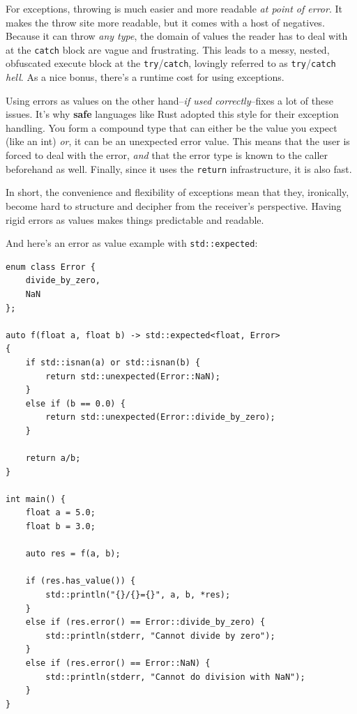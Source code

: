 \documentclass[12pt, letterpaper]{article}
\newenvironment{answerblock}{\color{Green4}}{\normalcolor\vspace{1em}}
\begin{document}
\begin{answerblock}
For exceptions, throwing is much easier and more readable
\emph{at point of error}. It makes the throw site more readable, but it comes
with a host of negatives. Because it can throw \emph{any type}, the domain of
values the reader has to deal with at the \texttt{catch} block are vague and
frustrating. This leads to a messy, nested, obfuscated execute block at the
\texttt{try}/\texttt{catch}, lovingly referred to as
\texttt{try}/\texttt{catch} \emph{hell}. As a nice bonus, there's a runtime
cost for using exceptions.

Using errors as values on the other hand--\emph{if used correctly}--fixes a lot
of these issues. It's why \textbf{safe} languages like Rust adopted this style
for their exception handling. You form a compound type that can either be the
value you expect (like an int) \emph{or}, it can be an unexpected error value.
This means that the user is forced to deal with the error, \emph{and} that the
error type is known to the caller beforehand as well. Finally, since it uses
the \texttt{return} infrastructure, it is also fast.

In short, the convenience and flexibility of exceptions mean that they,
ironically, become hard to structure and decipher from the receiver's
perspective. Having rigid errors as values makes things predictable and
readable.

And here's an error as value example with \texttt{std::expected}:

\begin{minipage}{\textwidth}
\begin{verbatim}
enum class Error {
    divide_by_zero,
    NaN
};

auto f(float a, float b) -> std::expected<float, Error>
{
    if std::isnan(a) or std::isnan(b) {
        return std::unexpected(Error::NaN);
    }
    else if (b == 0.0) {
        return std::unexpected(Error::divide_by_zero);
    }

    return a/b;
}

int main() {
    float a = 5.0;
    float b = 3.0;

    auto res = f(a, b);

    if (res.has_value()) {
        std::println("{}/{}={}", a, b, *res);
    }
    else if (res.error() == Error::divide_by_zero) {
        std::println(stderr, "Cannot divide by zero");
    }
    else if (res.error() == Error::NaN) {
        std::println(stderr, "Cannot do division with NaN");
    }
}
\end{verbatim}
\end{minipage}
\end{answerblock}
\end{document}
